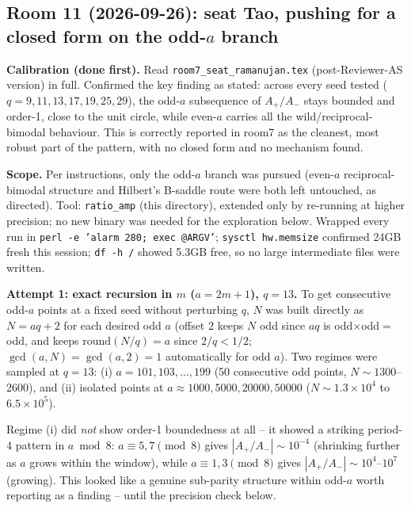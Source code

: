 \subsection*{Room 11 (2026-09-26): seat Tao, pushing for a closed form on the odd-$a$ branch}

\textbf{Calibration (done first).} Read \texttt{room7\_seat\_ramanujan.tex} (post-Reviewer-AS
version) in full. Confirmed the key finding as stated: across every seed tested
($q=9,11,13,17,19,25,29$), the odd-$a$ subsequence of $A_+/A_-$ stays bounded and order-1, close
to the unit circle, while even-$a$ carries all the wild/reciprocal-bimodal behaviour. This is
correctly reported in room7 as the cleanest, most robust part of the pattern, with no closed
form and no mechanism found.

\textbf{Scope.} Per instructions, only the odd-$a$ branch was pursued (even-$a$
reciprocal-bimodal structure and Hilbert's B-saddle route were both left untouched, as directed).
Tool: \texttt{ratio\_amp} (this directory), extended only by re-running at higher precision;
no new binary was needed for the exploration below. Wrapped every run in \texttt{perl -e 'alarm
280; exec @ARGV'}; \texttt{sysctl hw.memsize} confirmed 24GB fresh this session; \texttt{df -h /}
showed 5.3GB free, so no large intermediate files were written.

\textbf{Attempt 1: exact recursion in $m$ ($a=2m+1$), $q=13$.} To get consecutive odd-$a$ points
at a fixed seed without perturbing $q$, $N$ was built directly as $N=aq+2$ for each desired odd
$a$ (offset $2$ keeps $N$ odd since $aq$ is odd$\times$odd$=$odd, and keeps
$\mathrm{round}(N/q)=a$ since $2/q<1/2$; $\gcd(a,N)=\gcd(a,2)=1$ automatically for odd $a$). Two
regimes were sampled at $q=13$: (i) $a=101,103,\dots,199$ (50 consecutive odd points,
$N\sim1300$--$2600$), and (ii) isolated points at $a\approx1000,5000,20000,50000$
($N\sim1.3\times10^4$ to $6.5\times10^5$).

Regime (i) did \emph{not} show order-1 boundedness at all -- it showed a striking period-4
pattern in $a\bmod 8$: $a\equiv5,7\pmod 8$ gives $|A_+/A_-|\sim10^{-4}$ (shrinking further as $a$
grows within the window), while $a\equiv1,3\pmod8$ gives $|A_+/A_-|\sim10^{4}$--$10^{7}$ (growing).
This looked like a genuine sub-parity structure within odd-$a$ worth reporting as a finding --
until the precision check below.


